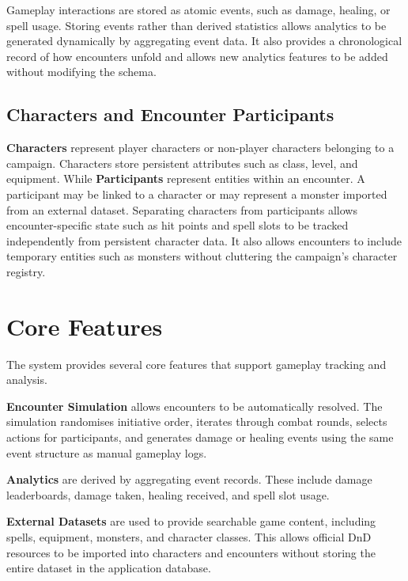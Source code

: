 \documentclass[11pt]{article}
\begin{document}
Gameplay interactions are stored as atomic events, such as damage,
healing, or spell usage. Storing events rather than derived statistics
allows analytics to be generated dynamically by aggregating event data.
It also provides a chronological record of how encounters unfold and
allows new analytics features to be added without modifying the schema.

\subsection{Characters and Encounter Participants}

\textbf{Characters} represent player characters or non-player characters belonging to a campaign. Characters store persistent attributes such as class, level, and equipment.
While \textbf{Participants} represent entities within an encounter. A participant may be linked to a character or may represent a monster imported from an external dataset.
Separating characters from participants allows encounter-specific state such as hit points and spell slots to be tracked independently from persistent character data. It also
allows encounters to include temporary entities such as monsters without cluttering the campaign's character registry.

\section{Core Features}

The system provides several core features that support gameplay tracking
and analysis.

\textbf{Encounter Simulation} allows encounters to be automatically
resolved. The simulation randomises initiative order, iterates through
combat rounds, selects actions for participants, and generates damage or
healing events using the same event structure as manual gameplay logs.

\textbf{Analytics} are derived by aggregating event records. These include
damage leaderboards, damage taken, healing received, and spell slot usage.

\textbf{External Datasets} are used to provide searchable game content,
including spells, equipment, monsters, and character classes. This allows
official DnD resources to be imported into characters and encounters
without storing the entire dataset in the application database.
\end{document}
